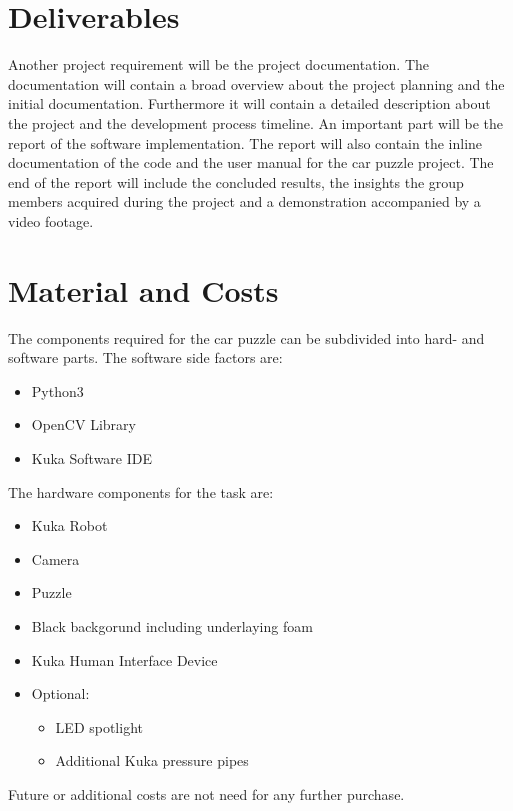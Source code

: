 \documentclass[a4paper, 12pt]{scrartcl}%
\begin{document}
	\section{Deliverables}
	Another project requirement will be the project documentation. The documentation will contain a broad overview about the project planning and the initial documentation. Furthermore it will contain a detailed description about the project and the development process timeline. An important part will be the report of the software implementation. The report will also contain the inline documentation of the code and the user manual for the car puzzle project.\newline
	The end of the report will include the concluded results, the insights the group members acquired during the project and a demonstration accompanied by a video footage.\newline
	
	\section{Material and Costs}
	The components required for the car puzzle can be subdivided into hard- and software parts. The software side factors are:\newline
	\begin{itemize}
		\item Python3
		\item OpenCV Library
		\item Kuka Software IDE
	\end{itemize}
	The hardware components for the task are:\newline
	\begin{itemize}
		\item Kuka Robot
		\item Camera
		\item Puzzle
		\item Black backgorund including underlaying foam
		\item Kuka Human Interface Device
		\item Optional:
		\begin{itemize}
			\item LED spotlight
			\item Additional Kuka pressure pipes
		\end{itemize}
	\end{itemize}
	Future or additional costs are not need for any further purchase.\newline
	
\end{document}
